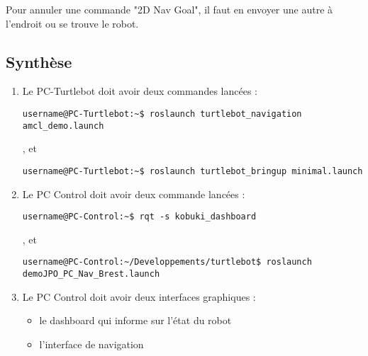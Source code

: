 \documentclass[11pt, a4paper,notitlepage]{article}
\begin{document}
Pour annuler une commande "2D Nav Goal", il faut en envoyer une autre à l'endroit ou se trouve le robot.

\subsection{Synthèse}
\begin{enumerate}
  \item Le PC-Turtlebot doit avoir deux commandes lancées :
    \begin{lstlisting}[style=Bash]
      username@PC-Turtlebot:~$ roslaunch turtlebot_navigation amcl_demo.launch
    \end{lstlisting}, et
    \begin{lstlisting}[style=Bash]
      username@PC-Turtlebot:~$ roslaunch turtlebot_bringup minimal.launch
    \end{lstlisting}
  \item Le PC Control doit avoir deux commande lancées :
    \begin{lstlisting}[style=Bash]
      username@PC-Control:~$ rqt -s kobuki_dashboard
    \end{lstlisting}, et
    \begin{lstlisting}[style=Bash]
      username@PC-Control:~/Developpements/turtlebot$ roslaunch demoJPO_PC_Nav_Brest.launch
    \end{lstlisting}
  \item Le PC Control doit avoir deux interfaces graphiques :
  \begin{itemize}
    \item le dashboard qui informe sur l'état du robot
    \item l'interface de navigation
  \end{itemize}
\end{enumerate}



\label{fin}
\end{document}
